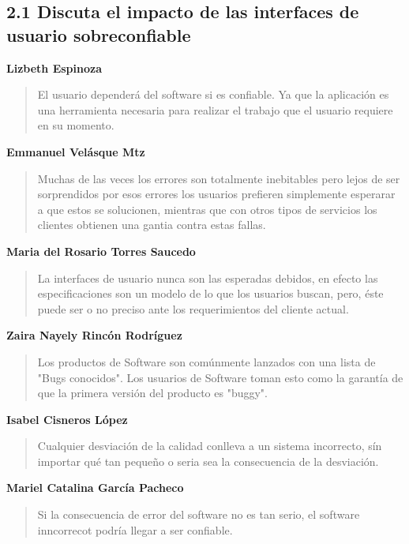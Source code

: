 \subsection*{2.1 Discuta el impacto de las interfaces de usuario sobreconfiable}

\textbf{Lizbeth Espinoza}

\begin{quote}
	El usuario dependerá del software si es confiable. Ya que la aplicación es una herramienta necesaria para realizar el trabajo que el usuario requiere en su momento.
\end{quote}

\textbf{Emmanuel Vel\'asque Mtz}

\begin{quote}
	Muchas de las veces los errores son totalmente inebitables pero lejos de ser sorprendidos por esos errores los usuarios prefieren simplemente esperarar a que estos se solucionen, mientras que con otros tipos de servicios los clientes obtienen una gantia contra estas fallas.
\end{quote}
	
\textbf{Maria del Rosario Torres Saucedo}
\begin{quote}
La interfaces de usuario nunca son las esperadas debidos, en efecto las especificaciones son un modelo de lo que los usuarios buscan, pero, éste puede ser o no preciso ante los requerimientos del cliente actual.
\end{quote}
	
\textbf{Zaira Nayely Rincón Rodríguez}
\begin{quote}
Los productos de Software son comúnmente lanzados con una lista de "Bugs conocidos". Los usuarios de Software toman esto como la garantía de que la primera versión del producto es "buggy".
\end{quote}

\textbf{Isabel Cisneros López}
\begin{quote}
Cualquier desviación de la calidad conlleva a un sistema incorrecto, sín importar qué tan pequeño o seria sea la consecuencia de la desviación.
\end{quote}

\textbf{Mariel Catalina García Pacheco}
\begin{quote}
Si la consecuencia de error del software no es tan serio, el software inncorrecot podría llegar a ser confiable.
\end{quote}

